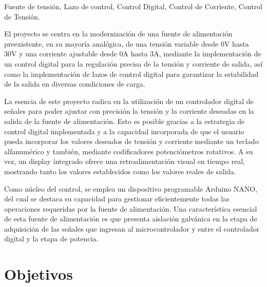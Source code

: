 
\begin{resumen}{Fuente de tensión, Lazo de control, Control Digital, Control de Corriente, Control de Tensión.}

El proyecto se centra en la modernización de una fuente de alimentación preexistente, en su mayoría analógica, de una tensión variable desde 0V hasta 30V y una corriente ajustable desde 0A hasta 3A, mediante la implementación de un control digital para la regulación precisa de la tensión y corriente de salida, así como la implementación de lazos de control digital para garantizar la estabilidad de la salida en diversas condiciones de carga. \par

La esencia de este proyecto radica en la utilización de un controlador digital de señales para poder ajustar con precisión la tensión y la corriente deseadas en la salida de la fuente de alimentación. Esto es posible gracias a la estrategia de control digital implementada y a la capacidad incorporada de que el usuario pueda incorporar los valores deseados de tensión y corriente mediante un teclado alfanumérico y también, mediante codificadores potenciómetros rotativos. A su vez, un display integrado ofrece una retroalimentación visual en tiempo real, mostrando tanto los valores establecidos como los valores reales de salida.\par

Como núcleo del control, se emplea un dispositivo programable Arduino NANO, del cual se destaca su capacidad para gestionar eficientemente todas las operaciones requeridas por la fuente de alimentación. Una característica esencial de esta fuente de alimentación es que presenta aislación galvánica en la etapa de adquisición de las señales que ingresan al microcontrolador y entre el controlador digital y la etapa de potencia.\par

\section*{Objetivos}


\end{resumen}

